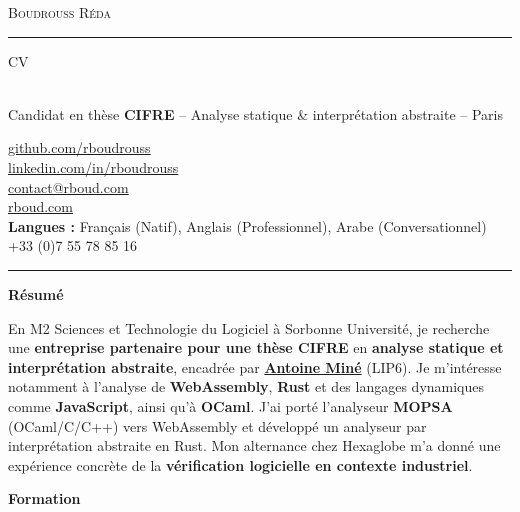 \documentclass[10pt,A4]{article}
\newcommand{\cvsection}[1]
{
	\begin{center}
		\large\textcolor{sectcol}{\textbf{#1}}
	\end{center}
}
\newcommand{\metasection}[2]
{
\footnotesize{#2} \hspace*{\fill} \footnotesize{#1}\\[1pt]
}
\begin{document}
\pagestyle{fancy}


\vspace{-8pt}
\begin{center}
    {\HUGE \textsc{Boudrouss Réda} \textcolor{sectcol}{\rule[-1mm]{1mm}{0.9cm}} \textsc{CV}}\\[2pt]
    {\small Candidat en thèse \textbf{CIFRE} -- Analyse statique \& interprétation abstraite -- Paris}
\end{center}

\vspace{6pt}

\metasection{\href{https://github.com/rboudrouss}{github.com/rboudrouss}}{}
\metasection{\href{https://www.linkedin.com/in/rboudrouss}{linkedin.com/in/rboudrouss}}{}
\metasection{\href{mailto:contact@rboud.com}{contact@rboud.com}}{}
\metasection{\href{https://rboud.com}{rboud.com}}{}
\metasection{+33 (0)7 55 78 85 16}{\textbf{Langues :} Français (Natif), Anglais (Professionnel), Arabe (Conversationnel)}

\vspace{-15pt}
\textcolor{softcol}{\hrule}

\normalsize

\cvsection{Résumé}
En M2 Sciences et Technologie du Logiciel à Sorbonne Université, je recherche une \textbf{entreprise partenaire pour une thèse CIFRE} en \textbf{analyse statique et interprétation abstraite}, encadrée par \href{https://mine.perso.lip6.fr/index.html.fr}{\textbf{Antoine Miné}} (LIP6). Je m'intéresse notamment à l'analyse de \textbf{WebAssembly}, \textbf{Rust} et des langages dynamiques comme \textbf{JavaScript}, ainsi qu'à \textbf{OCaml}. J'ai porté l'analyseur \textbf{MOPSA} (OCaml/C/C++) vers WebAssembly et développé un analyseur par interprétation abstraite en Rust. Mon alternance chez Hexaglobe m'a donné une expérience concrète de la \textbf{vérification logicielle en contexte industriel}.

\cvsection{Formation}
\end{document}
